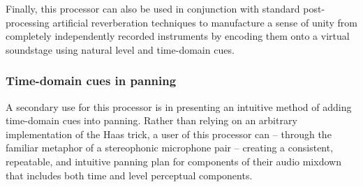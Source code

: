 Finally, this processor can also be used in conjunction with standard post-processing artificial reverberation techniques to manufacture a sense of unity from completely independently recorded instruments by encoding them onto a virtual soundstage using natural level and time-domain cues. 

\subsubsection{Time-domain cues in panning}

A secondary use for this processor is in presenting an intuitive method of adding time-domain cues into panning. Rather than relying on an arbitrary implementation of the Haas trick, a user of this processor can -- through the familiar metaphor of a stereophonic microphone pair -- creating a consistent, repeatable, and intuitive panning plan for components of their audio mixdown that includes both time and level perceptual components. 

